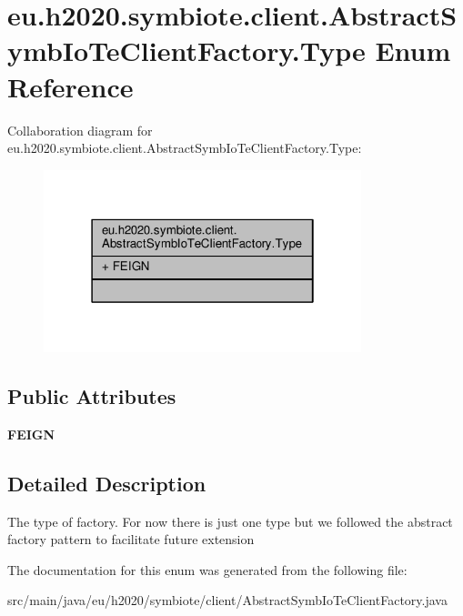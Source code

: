 \hypertarget{enumeu_1_1h2020_1_1symbiote_1_1client_1_1AbstractSymbIoTeClientFactory_1_1Type}{}\section{eu.\+h2020.\+symbiote.\+client.\+Abstract\+Symb\+Io\+Te\+Client\+Factory.\+Type Enum Reference}
\label{enumeu_1_1h2020_1_1symbiote_1_1client_1_1AbstractSymbIoTeClientFactory_1_1Type}


Collaboration diagram for eu.\+h2020.\+symbiote.\+client.\+Abstract\+Symb\+Io\+Te\+Client\+Factory.\+Type\+:
\nopagebreak
\begin{figure}[H]
\begin{center}
\leavevmode
\includegraphics[width=262pt]{enumeu_1_1h2020_1_1symbiote_1_1client_1_1AbstractSymbIoTeClientFactory_1_1Type__coll__graph}
\end{center}
\end{figure}
\subsection*{Public Attributes}
\begin{DoxyCompactItemize}
\item 
\mbox{\label{enumeu_1_1h2020_1_1symbiote_1_1client_1_1AbstractSymbIoTeClientFactory_1_1Type_ac3f80a0f063a51689cfb61173017ad7f}} 
{\bfseries F\+E\+I\+GN}
\end{DoxyCompactItemize}


\subsection{Detailed Description}
The type of factory. For now there is just one type but we followed the abstract factory pattern to facilitate future extension 

The documentation for this enum was generated from the following file\+:\begin{DoxyCompactItemize}
\item 
src/main/java/eu/h2020/symbiote/client/Abstract\+Symb\+Io\+Te\+Client\+Factory.\+java\end{DoxyCompactItemize}

